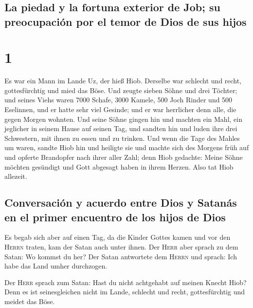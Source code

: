 \hypertarget{la-piedad-y-la-fortuna-exterior-de-job-su-preocupaciuxf3n-por-el-temor-de-dios-de-sus-hijos}{%
\subsection{La piedad y la fortuna exterior de Job; su preocupación por
el temor de Dios de sus
hijos}\label{la-piedad-y-la-fortuna-exterior-de-job-su-preocupaciuxf3n-por-el-temor-de-dios-de-sus-hijos}}

\hypertarget{section}{%
\section{1}\label{section}}

 Es war ein Mann im Lande Uz, der hieß Hiob. Derselbe war
schlecht und recht, gottesfürchtig und mied das Böse.  Und
zeugte sieben Söhne und drei Töchter;  und seines Viehs
waren 7000 Schafe, 3000 Kamele, 500 Joch Rinder und 500 Eselinnen, und
er hatte sehr viel Gesinde; und er war herrlicher denn alle, die gegen
Morgen wohnten.  Und seine Söhne gingen hin und machten
ein Mahl, ein jeglicher in seinem Hause auf seinen Tag, und sandten hin
und luden ihre drei Schwestern, mit ihnen zu essen und zu trinken.
 Und wenn die Tage des Mahles um waren, sandte Hiob hin
und heiligte sie und machte sich des Morgens früh auf und opferte
Brandopfer nach ihrer aller Zahl; denn Hiob gedachte: Meine Söhne
möchten gesündigt und Gott abgesagt haben in ihrem Herzen. Also tat Hiob
allezeit.

\hypertarget{conversaciuxf3n-y-acuerdo-entre-dios-y-satanuxe1s-en-el-primer-encuentro-de-los-hijos-de-dios}{%
\subsection{Conversación y acuerdo entre Dios y Satanás en el primer
encuentro de los hijos de
Dios}\label{conversaciuxf3n-y-acuerdo-entre-dios-y-satanuxe1s-en-el-primer-encuentro-de-los-hijos-de-dios}}

 Es begab sich aber auf einen Tag, da die Kinder Gottes
kamen und vor den \textsc{Herrn} traten, kam der Satan auch unter ihnen.
 Der \textsc{Herr} aber sprach zu dem Satan: Wo kommst du
her? Der Satan antwortete dem \textsc{Herrn} und sprach: Ich habe das
Land umher durchzogen.

 Der \textsc{Herr} sprach zum Satan: Hast du nicht
achtgehabt auf meinen Knecht Hiob? Denn es ist seinesgleichen nicht im
Lande, schlecht und recht, gottesfürchtig und meidet das Böse.

